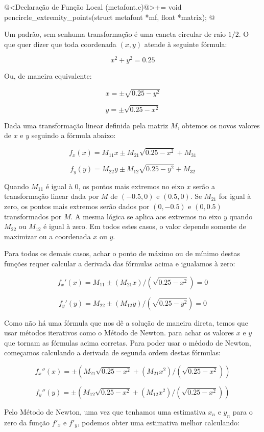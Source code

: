 {{{{{{\iniciocodigo
@<Declaração de Função Local (metafont.c)@>+=
void pencircle_extremity_points(struct metafont *mf, float *matrix);
@
\fimcodigo

Um  padrão, sem senhuma transformação é uma
caneta circular de raio $1/2$. O que quer dizer que toda coordenada
$(x,y)$ atende à seguinte fórmula:

$$
x^2+y^2= 0.25
$$

Ou, de maneira equivalente:

$$
x=\pm\sqrt{0.25-y^2}
$$

$$
y=\pm\sqrt{0.25-x^2}
$$

Dada uma transformação linear definida pela matriz $M$, obtemos os novos
valores de $x$ e $y$ seguindo a fórmula abaixo:

$$
f_x(x) = M_{11}x \pm M_{21}\sqrt{0.25-x^2} + M_{31}
$$

$$
f_y(y) = M_{22}y \pm M_{12}\sqrt{0.25-y^2} + M_{32}
$$

Quando $M_{11}$ é igual à 0, os pontos mais extremos no eixo $x$ serão
a transformação linear dada por $M$ de $(-0.5, 0)$ e $(0.5, 0)$. Se
$M_{21}$ for igual à zero, os pontos mais extremos serão dados por
$(0, -0.5)$ e $(0, 0.5)$ transformados por $M$. A mesma lógica se
aplica aos extremos no eixo $y$ quando $M_{22}$ ou $M_{12}$ é igual à
zero. Em todos estes casos, o valor depende somente de maximizar ou a
coordenada $x$ ou $y$.

Para todos os demais casos, achar o ponto de máximo ou de mínimo
destas funções requer calcular a derivada das fórmulas acima e
igualamos à zero:

$$
f_x'(x)=M_{11} \pm (M_{21}x)/(\sqrt{0.25-x^2})=0
$$

$$
f_y'(y)=M_{22} \pm (M_{12}y)/(\sqrt{0.25-y^2})=0
$$

Como não há uma fórmula que nos dê a solução de maneira direta, temos
que usar métodos iterativos como o Método de Newton. para achar os
valores $x$ e $y$ que tornam as fórmulas acima corretas. Para poder
usar o médodo de Newton, começamos calculando a derivada de segunda
ordem destas fórmulas:

$$
f_x''(x)= \pm (M_{21}\sqrt{0.25-x^2}+(M_{21}x^2)/(\sqrt{0.25-x^2}))
$$

$$
f_y''(y)= \pm (M_{12}\sqrt{0.25-x^2}+(M_{12}x^2)/(\sqrt{0.25-x^2}))
$$

Pelo Método de Newton, uma vez que tenhamos uma estimativa $x_n$ e
$y_n$ para o zero da função $f'_x$ e $f'_y$, podemos obter uma
estimativa melhor calculando:

}}}}}}
